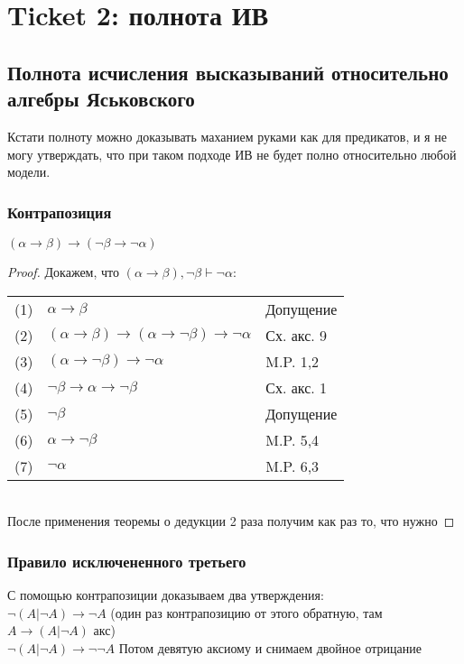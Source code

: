 \section{Ticket 2: полнота ИВ}
\label{sec-4}
\subsection{Полнота исчисления высказываний относительно алгебры Яськовского}
\label{sec-4-1}
Кстати полноту можно доказывать маханием руками как для предикатов,
и я не могу утверждать, что при таком подходе ИВ не будет полно
относительно любой модели.
\subsubsection{Контрапозиция}
\label{sec-4-1-1}
\begin{lemma}
    $(\alpha \to \beta) \to (\lnot \beta \to \lnot \alpha)$
\end{lemma}
\begin{proof}
    Докажем, что $(\alpha \to \beta), \lnot \beta \vdash \lnot \alpha$:\\
    \begin{tabular}{lll}
    (1) & $\alpha \to \beta$& Допущение\\
    (2) & $(\alpha \to \beta) \to (\alpha \to \lnot \beta) \to \lnot \alpha$& Сх. акс. 9\\
    (3) & $(\alpha \to \lnot \beta) \to \lnot \alpha$& M.P. 1,2\\
    (4) & $\lnot \beta \to \alpha \to \lnot \beta$& Сх. акс. 1\\
    (5) & $\lnot \beta$& Допущение\\
    (6) & $\alpha \to \lnot \beta$& M.P. 5,4\\
    (7) & $\lnot \alpha$& M.P. 6,3\\
    \end{tabular}\\
    После применения теоремы о дедукции 2 раза получим как раз то, что нужно
\end{proof}
\subsubsection{Правило исключененного третьего}
\label{sec-4-1-2}
С помощью контрапозиции доказываем два утверждения:\\
$\lnot (A|\lnot A)\to \lnot A$ (один раз контрапозицию от этого обратную, там $A\to (A|\lnot A)$ акс) \\
$\lnot (A|\lnot A)\to \lnot \lnot A$
Потом девятую аксиому и снимаем двойное отрицание
